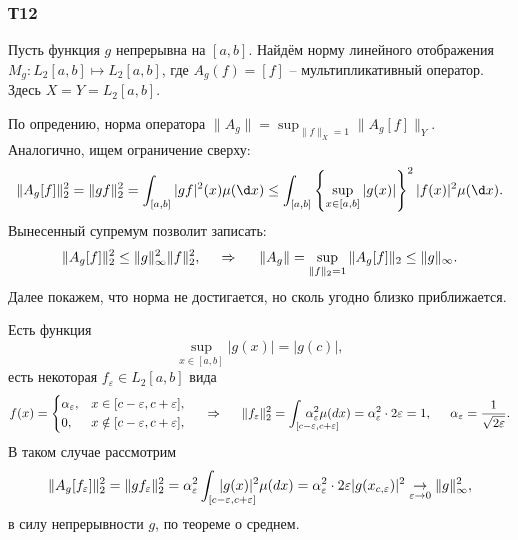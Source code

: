 \subsubsection*{Т12}


Пусть функция $g$ непрерывна на $[a, b]$. Найдём норму линейного отображения $M_g \colon L_2[a, b] \mapsto L_2[a,b]$, где $A_g(f) = [f]$ -- мультипликативный оператор. Здесь $X=Y=L_2[a,b]$. 

По опредению, норма оператора $\|A_g\| = \sup_{\|f\|_X = 1} \|A_g [f]\|_Y$. Аналогично, ищем ограничение сверху:
\begin{equation*}
    \|A_g [f]\|_2^2 = \|gf\|_2^2 = \int_{[a, b]} |gf|^2 (x) \mu(\d x) \leq 
    \int_{[a, b]} \left\{
        \sup_{x\in[a,b]} |g(x)|
    \right\}^2 |f(x)|^2 \mu(\d x).
\end{equation*}
Вынесенный супремум позволит записать:
\begin{equation*}
    \|A_g[f]\|_2^2 \leq \|g\|_\infty^2 \|f\|_2^2,
    \hspace{0.5cm} \Rightarrow \hspace{0.5cm}
    \|A_g\| = \sup_{\|f\|_2=1} \|A_g[f]\|_2 \leq \|g\|_\infty.
\end{equation*}
Далее покажем, что норма не достигается, но сколь угодно близко приближается.


Есть функция 
\begin{equation*}
    \sup_{x\in[a,b]} |g(x)| = |g(c)|,
\end{equation*}
есть некоторая $f_\varepsilon \in L_2[a, b]$ вида
\begin{equation*}
    f(x) = \left\{\begin{aligned}
        &\alpha_\varepsilon, &x\in[c-\varepsilon, c+\varepsilon], \\
        &0, &x\notin[c-\varepsilon, c+\varepsilon],
    \end{aligned}\right.
    \hspace{0.5cm} \Rightarrow \hspace{0.5cm}
    \|f_\varepsilon\|_2^2 = \int_{[c-\varepsilon, c+\varepsilon]} \hspace{-10mm} \alpha_\varepsilon^2 \mu(d x) =
    \alpha_\varepsilon^2 \cdot 2 \varepsilon = 1,
    \hspace{5 mm} 
    \alpha_\varepsilon = \frac{1}{\sqrt{2\varepsilon}}.
\end{equation*}
В таком случае рассмотрим
\begin{equation*}
    \|A_g [f_\varepsilon]\|_2^2 = \|g f_\varepsilon\|_2^2 = \alpha_\varepsilon^2 \int_{[c-\varepsilon, c+\varepsilon]} \hspace{-10mm} |g(x)|^2 \mu(dx) = \alpha_\varepsilon^2 \cdot 2 \varepsilon |g(x_{c,\varepsilon})|^2 \underset{\varepsilon\to 0}{\to} \|g\|_\infty^2,
\end{equation*}
в силу непрерывности $g$, по теореме о среднем.


